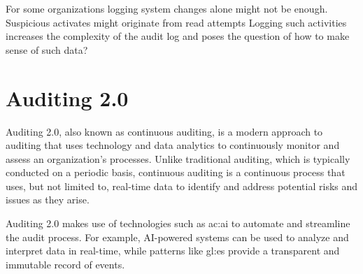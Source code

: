 For some organizations logging system changes alone might not be enough. Suspicious activates might originate from read attempts Logging such activities increases the complexity of the audit log and poses the question of how to make sense of such data?


\section{Auditing 2.0}\label{sec:adt2}

Auditing 2.0, also known as continuous auditing, is a modern approach to auditing that uses technology and data analytics to continuously monitor and assess an organization's processes. Unlike traditional auditing, which is typically conducted on a periodic basis, continuous auditing is a continuous process that uses, but not limited to, real-time data to identify and address potential risks and issues as they arise.~\citep{5427384}




Auditing 2.0 makes use of technologies such as \gls{ac:ai} to automate and streamline the audit process. For example, AI-powered systems can be used to analyze and interpret data in real-time, while patterns like \gls{gl:es} provide a transparent and immutable record of events. 

